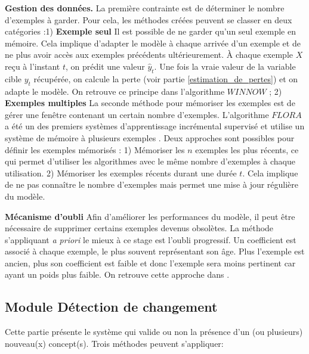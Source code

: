 \documentclass[utf8]{stageM2R} %
\theoremstyle{remark}
\renewcommand{\emph}{\textbf}
\begin{document}
\textbf{Gestion des données. } La première contrainte est de déterminer le nombre d'exemples à garder. Pour cela, les méthodes créées peuvent se classer en deux catégories :1) \emph{Exemple seul} Il est possible de ne garder qu'un seul exemple en mémoire. Cela implique d'adapter le modèle à chaque arrivée d'un exemple et de ne plus avoir accès aux exemples précédents ultérieurement. À chaque exemple $X$ reçu à l'instant $t$, on prédit une valeur $\widehat{y}_t$. Une fois la vraie valeur de la variable cible $y_t$ récupérée, on calcule la perte (voir partie \ref{estimation_de_pertes}) et on adapte le modèle. On retrouve ce principe dans l'algorithme $WINNOW$ \cite{Littlestone1988}; 2) \emph{Exemples multiples} La seconde méthode pour mémoriser les exemples est de gérer une fenêtre contenant un certain nombre d'exemples. L'algorithme $FLORA$ a été un des premiers systèmes d'apprentissage incrémental supervisé et utilise un système de mémoire à plusieurs exemples \cite{Widmer1996}. Deux approches sont possibles pour définir les exemples mémorisés : 1) Mémoriser les $n$ exemples les plus récents, ce qui permet d'utiliser les algorithmes avec le même nombre d'exemples à chaque utilisation. 2) Mémoriser les exemples récents durant une durée $t$. Cela implique de ne pas connaître le nombre d'exemples mais permet une mise à jour régulière du modèle.

\textbf{Mécanisme d'oubli} Afin d'améliorer les performances du modèle, il peut être nécessaire de supprimer certains exemples devenus obsolètes. La méthode s'appliquant \textit{a priori} le mieux à ce stage est l'oubli progressif.
Un coefficient est associé à chaque exemple, le plus souvent représentant son âge. Plus l'exemple est ancien, plus son coefficient est faible et donc l'exemple sera moins pertinent car ayant un poids plus faible. On retrouve cette approche dans \cite{koychev2000adaptation}.

\subsection{Module Détection de changement}
Cette partie présente le système qui valide ou non la présence d'un (ou plusieurs) nouveau(x) concept(s). Trois méthodes peuvent s'appliquer: 
\end{document}

